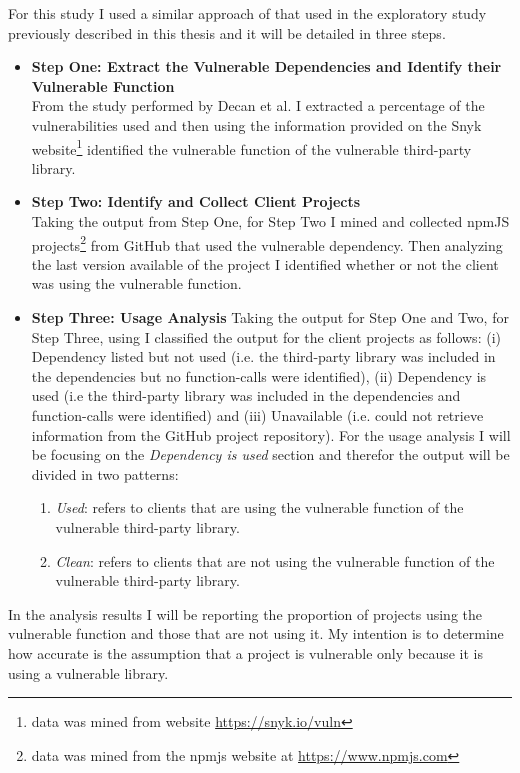 For this study I used a similar approach of that used in the exploratory study previously described in this thesis and it will be detailed in three steps.
\begin{itemize}
    \item \textbf{Step One: Extract the Vulnerable Dependencies and Identify their Vulnerable Function}\\
    From the study performed by Decan et al. \cite{decan2018impact} I extracted a percentage of the vulnerabilities used and then using the information provided on the Snyk website\footnote{data was mined from website \url{https://snyk.io/vuln}} identified the vulnerable function of the vulnerable third-party library.
    
    \item \textbf{Step Two: Identify and Collect Client Projects} \\
    Taking the output from Step One, for Step Two I mined and collected npmJS projects\footnote{data was mined from the npmjs website at \url{https://www.npmjs.com}} from GitHub that used the vulnerable dependency. Then analyzing the last version available of the project I identified whether or not the client was using the vulnerable function.
    
    \item \textbf{Step Three: Usage Analysis}
    Taking the output for Step One and Two, for Step Three, using \tool[] I classified the output for the client projects as follows: (i) Dependency listed but not used (i.e. the third-party library was included in the dependencies but no function-calls were identified), (ii) Dependency is used (i.e the third-party library was included in the dependencies and function-calls were identified) and (iii) Unavailable (i.e. \tool[] could not retrieve information from the GitHub project repository). For the usage analysis I will be focusing on the \textit{Dependency is used} section and therefor the output will be divided in two patterns:
    \begin{enumerate}
        \item \textit{Used}: refers to clients that are using the vulnerable function of the vulnerable third-party library.
        \item \textit{Clean}: refers to clients that are not using the vulnerable function of the vulnerable third-party library.
    \end{enumerate}
\end{itemize}

In the analysis results I will be reporting the proportion of projects using the vulnerable function and those that are not using it. My intention is to determine how accurate is the assumption that a project is vulnerable only because it is using a vulnerable library.

